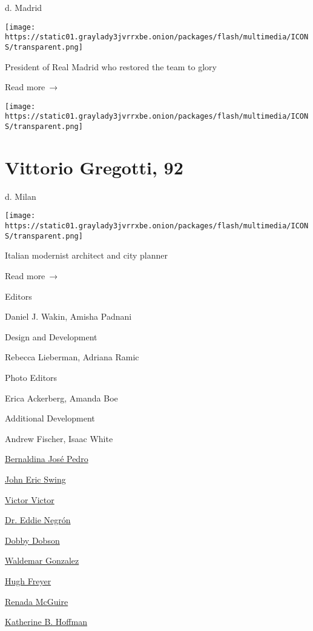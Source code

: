 d. Madrid

\texttt{[image: https://static01.graylady3jvrrxbe.onion/packages/flash/multimedia/ICONS/transparent.png]}

President of Real Madrid who restored the team to glory

 Read more~→

\href{https://www.nytimes3xbfgragh.onion/2020/03/16/arts/vittorio-gregotti-dies-coronavirus.html}{}

\texttt{[image: https://static01.graylady3jvrrxbe.onion/packages/flash/multimedia/ICONS/transparent.png]}

\hypertarget{vittorio-gregotti-92}{%
\section{Vittorio Gregotti, 92}\label{vittorio-gregotti-92}}

d. Milan

\texttt{[image: https://static01.graylady3jvrrxbe.onion/packages/flash/multimedia/ICONS/transparent.png]}

Italian modernist architect and city planner

 Read more~→

Editors

Daniel J. Wakin, Amisha Padnani

Design and Development

Rebecca Lieberman, Adriana Ramic

Photo Editors

Erica Ackerberg, Amanda Boe

Additional Development

Andrew Fischer, Isaac White

\protect\hyperlink{bernaldina-josuxe9-pedro}{Bernaldina José Pedro}

\protect\hyperlink{john-eric-swing}{John Eric Swing}

\protect\hyperlink{victor-victor-}{Victor Victor}

\protect\hyperlink{dr-eddie-negruxf3n}{Dr. Eddie Negrón}

\protect\hyperlink{dobby-dobson}{Dobby Dobson}

\protect\hyperlink{waldemar-gonzalez}{Waldemar Gonzalez}

\protect\hyperlink{hugh-freyer}{Hugh Freyer}

\protect\hyperlink{renada-mcguire}{Renada McGuire}

\protect\hyperlink{katherine-b-hoffman}{Katherine B. Hoffman}

